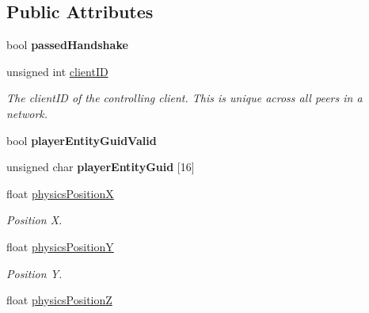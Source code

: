 \subsection*{Public Attributes}
\begin{DoxyCompactItemize}
\item 
\hypertarget{struct_game_state_1_1_client_aaa255868f031790535fa3d51e3a1fb0f}{bool {\bfseries passed\-Handshake}}\label{struct_game_state_1_1_client_aaa255868f031790535fa3d51e3a1fb0f}

\item 
\hypertarget{struct_game_state_1_1_client_a9caf2f8f0ce3cf8d082d73b9ec593e36}{unsigned int \hyperlink{struct_game_state_1_1_client_a9caf2f8f0ce3cf8d082d73b9ec593e36}{client\-I\-D}}\label{struct_game_state_1_1_client_a9caf2f8f0ce3cf8d082d73b9ec593e36}

\begin{DoxyCompactList}\small\item\em The client\-I\-D of the controlling client. This is unique across all peers in a network. \end{DoxyCompactList}\item 
\hypertarget{struct_game_state_1_1_client_a9c31d104128de9c3e61a657d748dcc3d}{bool {\bfseries player\-Entity\-Guid\-Valid}}\label{struct_game_state_1_1_client_a9c31d104128de9c3e61a657d748dcc3d}

\item 
\hypertarget{struct_game_state_1_1_client_a82922d755f0fd592a90878c16bae119b}{unsigned char {\bfseries player\-Entity\-Guid} \mbox{[}16\mbox{]}}\label{struct_game_state_1_1_client_a82922d755f0fd592a90878c16bae119b}

\item 
\hypertarget{struct_game_state_1_1_client_a304556b6fb37ad694423f4607ff57a2a}{float \hyperlink{struct_game_state_1_1_client_a304556b6fb37ad694423f4607ff57a2a}{physics\-Position\-X}}\label{struct_game_state_1_1_client_a304556b6fb37ad694423f4607ff57a2a}

\begin{DoxyCompactList}\small\item\em Position X. \end{DoxyCompactList}\item 
\hypertarget{struct_game_state_1_1_client_a5b1ecccf7a720b6ae80475b5e9b2aab1}{float \hyperlink{struct_game_state_1_1_client_a5b1ecccf7a720b6ae80475b5e9b2aab1}{physics\-Position\-Y}}\label{struct_game_state_1_1_client_a5b1ecccf7a720b6ae80475b5e9b2aab1}

\begin{DoxyCompactList}\small\item\em Position Y. \end{DoxyCompactList}\item 
\hypertarget{struct_game_state_1_1_client_a8b4fa85d72284fdf8a1381675b386bbe}{float \hyperlink{struct_game_state_1_1_client_a8b4fa85d72284fdf8a1381675b386bbe}{physics\-Position\-Z}}\label{struct_game_state_1_1_client_a8b4fa85d72284fdf8a1381675b386bbe}


\end{DoxyCompactItemize}
